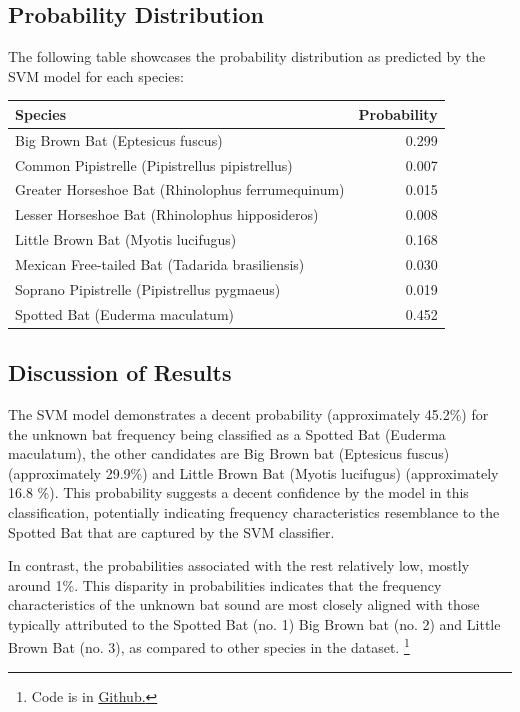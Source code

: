 \documentclass[12pt]{article}
\begin{document}
\subsection{Probability Distribution}
The following table showcases the probability distribution as predicted by the SVM model for each species:

\begin{center}
\begin{tabular}{lr}
\toprule
Species & Probability \\
\midrule
Big Brown Bat (Eptesicus fuscus) & 0.299 \\
Common Pipistrelle (Pipistrellus pipistrellus) & 0.007 \\
Greater Horseshoe Bat (Rhinolophus ferrumequinum) & 0.015 \\
Lesser Horseshoe Bat (Rhinolophus hipposideros) & 0.008 \\
Little Brown Bat (Myotis lucifugus) & 0.168 \\
Mexican Free-tailed Bat (Tadarida brasiliensis) & 0.030 \\
Soprano Pipistrelle (Pipistrellus pygmaeus) & 0.019 \\
Spotted Bat (Euderma maculatum) & 0.452 \\
\bottomrule
\end{tabular}
\end{center}

\subsection{Discussion of Results}
The SVM model demonstrates a decent probability (approximately 45.2\%) for the unknown bat frequency being classified as a Spotted Bat (Euderma maculatum), the other candidates are Big Brown bat (Eptesicus fuscus) (approximately 29.9\%) and Little Brown Bat (Myotis lucifugus) (approximately 16.8 \%). This probability suggests a decent confidence by the model in this classification, potentially indicating frequency characteristics resemblance to the Spotted Bat that are captured by the SVM classifier.

In contrast, the probabilities associated with the rest relatively low, mostly around 1\%. This disparity in probabilities indicates that the frequency characteristics of the unknown bat sound are most closely aligned with those typically attributed to the Spotted Bat (no. 1) Big Brown bat (no. 2) and Little Brown Bat (no. 3), as compared to other species in the dataset. \footnote{Code is in \href{https://github.com/hoang-nguyen13/Bat_Sound.git}{Github.}}
\end{document}
